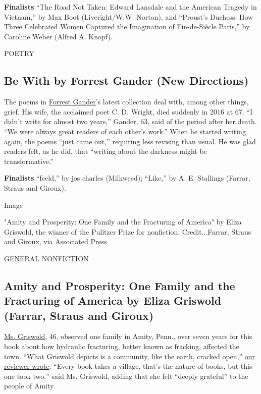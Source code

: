 \textbf{Finalists} ``The Road Not Taken: Edward Lansdale and the
American Tragedy in Vietnam,'' by Max Boot (Liveright/W.W. Norton), and
``Proust's Duchess: How Three Celebrated Women Captured the Imagination
of Fin-de-Siècle Paris,'' by Caroline Weber (Alfred A. Knopf).

POETRY

\hypertarget{be-with-by-forrest-gander-new-directions}{%
\subsection{Be With by Forrest Gander (New
Directions)}\label{be-with-by-forrest-gander-new-directions}}

The poems in \href{https://forrestgander.com/}{Forrest Gander}'s latest
collection deal with, among other things, grief. His wife, the acclaimed
poet C. D. Wright, died suddenly in 2016 at 67. ``I didn't write for
almost two years,'' Gander, 63, said of the period after her death. ``We
were always great readers of each other's work.'' When he started
writing again, the poems ``just came out,'' requiring less revising than
usual. He was glad readers felt, as he did, that ``writing about the
darkness might be transformative.''

\textbf{Finalists} ``feeld,'' by jos charles (Milkweed); ``Like,'' by A.
E. Stallings (Farrar, Straus and Giroux).

Image

"Amity and Prosperity: One Family and the Fracturing of America" by
Eliza Griswold, the winner of the Pulitzer Prize for nonfiction.
Credit...Farrar, Straus and Giroux, via Associated Press

GENERAL NONFICTION

\hypertarget{amity-and-prosperity-one-family-and-the-fracturing-of-america-by-eliza-griswold-farrar-straus-and-giroux}{%
\subsection{Amity and Prosperity: One Family and the Fracturing of
America by Eliza Griswold (Farrar, Straus and
Giroux)}\label{amity-and-prosperity-one-family-and-the-fracturing-of-america-by-eliza-griswold-farrar-straus-and-giroux}}

\href{https://www.elizagriswoldauthor.com/}{Ms. Griswold}, 46, observed
one family in Amity, Penn., over seven years for this book about how
hydraulic fracturing, better known as fracking, affected the town.
``What Griswold depicts is a community, like the earth, cracked open,''
\href{https://www.nytimes3xbfgragh.onion/2018/06/13/books/review-amity-prosperity-fracking-eliza-griswold.html}{our
reviewer wrote}. ``Every book takes a village, that's the nature of
books, but this one took two,'' said Ms. Griswold, adding that she felt
``deeply grateful'' to the people of Amity.


